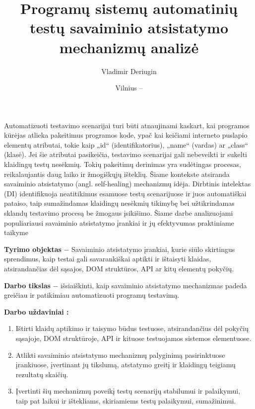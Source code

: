 \documentclass[
]{VUMIFPSkursinis}
\title{Programų sistemų automatinių testų savaiminio atsistatymo mechanizmų analizė}
\author{Vladimir Deriugin}
\date{Vilnius – \the\year}
\begin{document}
\maketitle

\tableofcontents



Automatizuoti testavimo scenarijai turi būti atnaujinami kaskart, kai programos kūrėjas atlieka pakeitimus programos kode, ypač kai keičiami interneto puslapio elementų atributai, tokie kaip „id“ (identifikatorius), „name“ (vardas) ar „class“ (klasė). Jei šie atributai pasikeičia, testavimo scenarijai gali nebeveikti ir sukelti klaidingų testų nesėkmių. Tokių pakeitimų derinimas yra sudėtingas procesas, reikalaujantis daug laiko ir žmogiškųjų išteklių. Šiame kontekste atsiranda savaiminio atsistatymo (angl. self-healing) mechanizmų idėja. Dirbtinis intelektas (DI) identifikuoja neatitikimus esamuose testų scenarijuose ir juos automatiškai pataiso, taip sumažindamas klaidingų nesėkmių tikimybę bei užtikrindamas sklandų testavimo procesą be žmogaus įsikišimo. Šiame darbe analizuojami populiariausi savaiminio atsistatymo įrankiai ir jų efektyvumas praktiniame taikyme

\textbf{Tyrimo objektas} $-$ Savaiminio atsistatymo įrankiai, kurie siūlo skirtingus sprendimus, kaip testai gali savarankiškai aptikti ir ištaisyti klaidas, atsirandančias dėl sąsajos, DOM struktūros, API ar kitų elementų pokyčių.

\textbf{Darbo tikslas} $-$  išsiaiškinti, kaip savaiminio atsistatymo mechanizmas padeda greičiau ir patikimiau automatizuoti programų testavimą.

\textbf{Darbo uždaviniai :} 
 
\begin{enumerate} 
    \item Ištirti klaidų aptikimo ir taisymo būdus testuose, atsirandančius dėl pokyčių sąsajoje, DOM struktūroje, API ir kituose testuojamos sistemos elementuose.
    \item Atlikti savaiminio atsistatymo mechanizmų palyginimą pasirinktuose įrankiuose, įvertinant jų tikslumą, atstatymo greitį ir klaidingų teigiamų rezultatų skaičių.
    \item Įvertinti šių mechanizmų poveikį testų scenarijų stabilumui ir palaikymui, taip pat laikui ir ištekliams, skiriamiems testų palaikymui, sumažinimui.
\end{enumerate}
\end{document}
